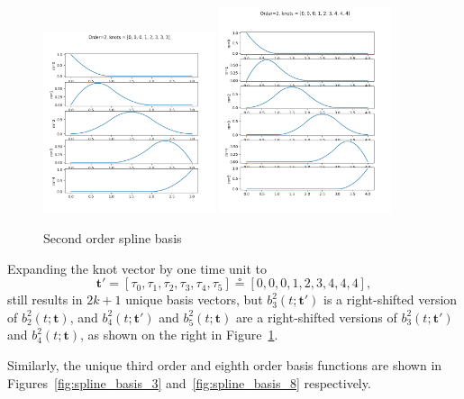 \documentclass{article}
\newcommand{\defeq}{\circeq}
\begin{document}
\begin{figure}[hbt]
  \centering
  	\includegraphics[width=0.45\textwidth]{./figures/spline_basis_2}
  	\includegraphics[width=0.45\textwidth]{./figures/spline_basis_2_extra_knot}
  \caption{Second order spline basis}
  \label{fig:spline_basis_2}  
\end{figure}
Expanding the knot vector by one time unit to 
\[
\mathbf{t}' = [\tau_0, \tau_1, \tau_2, \tau_3, \tau_4, \tau_5] \defeq [0, 0, 0, 1, 2, 3, 4, 4, 4],
\]
still results in $2k+1$ unique basis vectors, but $b_3^2(t; \mathbf{t}')$ is a right-shifted version of $b_2^2(t; \mathbf{t})$, and $b_4^2(t; \mathbf{t}')$ and $b_5^2(t; \mathbf{t})$ are a right-shifted versions of $b_3^2(t; \mathbf{t}')$ and $b_4^2(t; \mathbf{t})$, as shown on the right in Figure~\ref{fig:spline_basis_2}.

Similarly, the unique third order and eighth order basis functions are shown in Figures~\ref{fig:spline_basis_3} and~\ref{fig:spline_basis_8} respectively.
\end{document}
